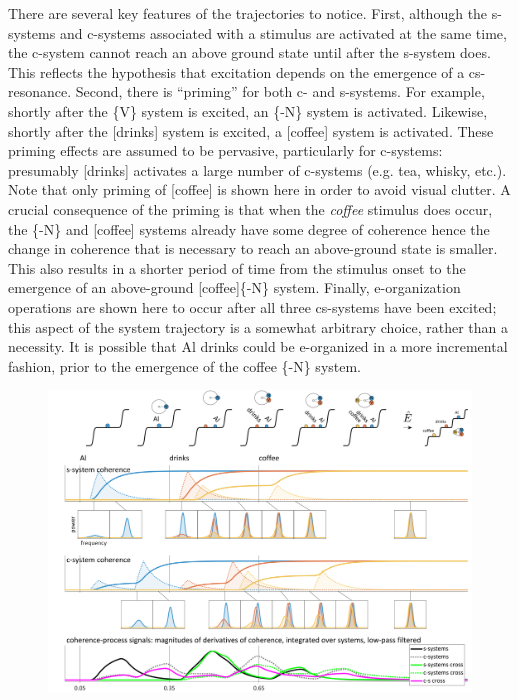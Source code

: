   There are several key features of the trajectories to notice. First, although the s-systems and c-systems associated with a stimulus are activated at the same time, the c-system cannot reach an above ground state until after the s-system does. This reflects the hypothesis that excitation depends on the emergence of a cs-resonance. Second, there is “priming” for both c- and s-systems. For example, shortly after the \{V\} system is excited, an \{-N\} system is activated. Likewise, shortly after the [drinks] system is excited, a [coffee] system is activated. These priming effects are assumed to be pervasive, particularly for c-systems: presumably [drinks] activates a large number of c-systems (e.g. tea, whisky, etc.). Note that only priming of [coffee] is shown here in order to avoid visual clutter. A crucial consequence of the priming is that when the \textit{coffee} stimulus does occur, the \{-N\} and [coffee] systems already have some degree of coherence hence the change in coherence that is necessary to reach an above-ground state is smaller. This also results in a shorter period of time from the stimulus onset to the emergence of an above-ground [coffee]\{-N\} system. Finally, e-organization operations are shown here to occur after all three cs-systems have been excited; this aspect of the system trajectory is a somewhat arbitrary choice, rather than a necessity. It is possible that {\textbar}Al drinks{\textbar} could be e-organized in a more incremental fashion, prior to the emergence of the {\textbar}coffee \{-N\}{\textbar} system. 

  
\begin{figure}
\includegraphics[width=\textwidth]{figures/Tilsen-img141.png}
\caption{\missingcaption}
\label{fig:6:22}
\end{figure}
 

